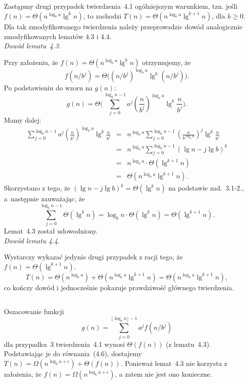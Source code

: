 \subsection{} %
Zastąpmy drugi przypadek twierdzenia~4.1 ogólniejszym warunkiem, tzn. jeśli $f(n)=\Theta(n^{\log_ba}\lg^kn)$, to zachodzi $T(n)=\Theta(n^{\log_ba}\lg^{k+1}n)$, dla $k\ge0$. Dla tak zmodyfikowanego twierdzenia należy przeprowadzic dowód analogicznie zmodyfikowanych lematów 4.3 i 4.4.\\

\noindent\emph{Dowód lematu~4.3.}

\noindent Przy założeniu, że $f(n)=\Theta(n^{\log_ba}\lg^kn)$ otrzymujemy, że
\[
	f(n/b^j)=\Theta\bigl((n/b^j)^{\log_ba}\lg^k(n/b^j)\bigr).
\]
Po podstawieniu do wzoru na $g(n)$:
\[
	g(n) = \Theta\biggl(\sum_{j=0}^{\log_bn-1}a^j\left(\frac{n}{b^j}\right)^{\log_ba}\lg^k\frac{n}{b^j}\biggr).
\]
Mamy dalej:
\begin{eqnarray*}
	\sum_{j=0}^{\log_bn-1}a^j\left(\frac{n}{b^j}\right)^{\log_ba}\lg^k\frac{n}{b^j} &=& n^{\log_ba}\sum_{j=0}^{\log_bn-1}\left(\frac{a}{b^{\log_ba}}\right)^j\lg^k\frac{n}{b^j} \\
	&=& n^{\log_ba}\sum_{j=0}^{\log_bn-1}(\lg n-j\lg b)^k \\
	&=& n^{\log_ba}\cdot\Theta(\lg^{k+1}n) \\
	&=& \Theta(n^{\log_ba}\lg^{k+1}n).
\end{eqnarray*}
Skorzystano z tego, że $(\lg n-j\lg b)^k=\Theta(\lg^kn)$ na podstawie zad.~3.1-2., a~następnie zauważając, że
\[
	\sum_{j=0}^{\log_bn-1}\Theta(\lg^kn) = \log_bn\cdot\Theta(\lg^kn) = \Theta(\lg^{k+1}n).
\]
Lemat~4.3 został udowodniony.\\

\noindent\emph{Dowód lematu 4.4.}

\noindent Wystarczy wykazać jedynie drugi przypadek z racji tego, że $f(n)=\Theta(\lg^{k+1}n)$.
\[
	T(n) = \Theta(n^{\log_ba})+\Theta(n^{\log_ba}\lg^{k+1}n) = \Theta(n^{\log_ba}\lg^{k+1}n),
\]
co kończy dowód i jednocześnie pokazuje prawdziwość głównego twierdzenia.

\subsection{} %
Oszacowanie funkcji
\[
	g(n) = \sum_{j=0}^{\lfloor\log_bn\rfloor-1}a^jf(n/b^j)
\]
dla przypadku~3 twierdzenia~4.1 wynosi $\Theta(f(n))$ (z lematu~4.3). Podstawiając je do równania~(4.6), dostajemy $T(n)=\Omega(n^{\log_ba+\epsilon})+\Theta(f(n))$. 
Ponieważ lemat~4.3 nie korzysta z założenia, że $f(n)=\Omega(n^{\log_ba+\epsilon})$, a zatem nie jest ono konieczne.

